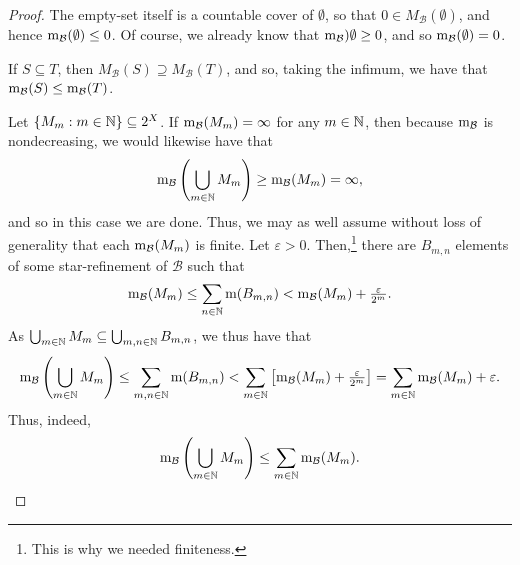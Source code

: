 \begin{thm}
\begin{savenotes}
\begin{proof}
The empty-set itself is a countable cover of $\emptyset$, so that $0\in M_{\mathcal{B}}(\emptyset )$, and hence $\mathrm{m} _{\mathcal{B}}(\emptyset )\leq 0$.  Of course, we already know that $\mathrm{m} _{\mathcal{B}})\emptyset \geq 0$, and so $\mathrm{m} _{\mathcal{B}}(\emptyset )=0$.

If $S\subseteq T$, then $M_{\mathcal{B}}(S)\supseteq M_{\mathcal{B}}(T)$, and so, taking the infimum, we have that $\mathrm{m} _{\mathcal{B}}(S)\leq \mathrm{m} _{\mathcal{B}}(T)$.

Let $\{ M_m:m\in \mathbb{N} \} \subseteq 2^X$.  If $\mathrm{m} _{\mathcal{B}}(M_m)=\infty$ for any $m\in \mathbb{N}$, then because $\mathrm{m} _{\mathcal{B}}$ is nondecreasing, we would likewise have that
\begin{equation}
\mathrm{m} _{\mathcal{B}}\left( \bigcup _{m\in \mathbb{N}}M_m\right) \geq \mathrm{m} _{\mathcal{B}}(M_m)=\infty ,
\end{equation}
and so in this case we are done.  Thus, we may as well assume without loss of generality that each $\mathrm{m} _{\mathcal{B}}(M_m)$ is finite.  Let $\varepsilon >0$.  Then,\footnote{This is why we needed finiteness.} there are $B_{m,n}$ elements of some star-refinement of $\mathcal{B}$ such that
\begin{equation}
\mathrm{m} _{\mathcal{B}}(M_m)\leq \sum _{n\in \mathbb{N}}\mathrm{m} (B_{m,n})<\mathrm{m} _{\mathcal{B}}(M_m)+\tfrac{\varepsilon}{2^m}.
\end{equation}
As $\bigcup _{m\in \mathbb{N}}M_m\subseteq \bigcup _{m,n\in \mathbb{N}}B_{m,n}$, we thus have that
\begin{equation}
\mathrm{m} _{\mathcal{B}}\left( \bigcup _{m\in \mathbb{N}}M_m\right) \leq \sum _{m,n\in \mathbb{N}}\mathrm{m} (B_{m,n})<\sum _{m\in \mathbb{N}}\left[ \mathrm{m} _{\mathcal{B}}(M_m)+\tfrac{\varepsilon}{2^m}\right] =\sum _{m\in \mathbb{N}}\mathrm{m} _{\mathcal{B}}(M_m)+\varepsilon .
\end{equation}
Thus, indeed,
\begin{equation}
\mathrm{m} _{\mathcal{B}}\left( \bigcup _{m\in \mathbb{N}}M_m\right) \leq \sum _{m\in \mathbb{N}}\mathrm{m} _{\mathcal{B}}(M_m).
\end{equation}
\end{proof}
\end{savenotes}
\end{thm}

